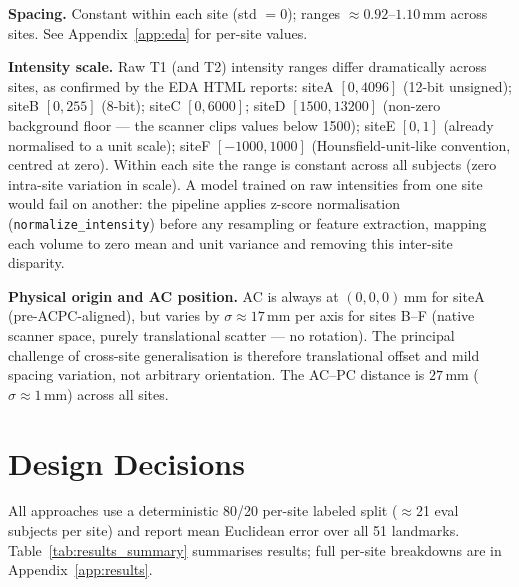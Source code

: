 \documentclass[11pt,letterpaper]{article}
\begin{document}
\textbf{Spacing.}
Constant within each site (std $= 0$); ranges $\approx 0.92$--$1.10$\,mm across sites.
See Appendix~\ref{app:eda} for per-site values.

\textbf{Intensity scale.}
Raw T1 (and T2) intensity ranges differ dramatically across sites, as confirmed by the EDA
HTML reports:
siteA $[0, 4096]$ (12-bit unsigned);
siteB $[0, 255]$ (8-bit);
siteC $[0, 6000]$;
siteD $[1500, 13200]$ (non-zero background floor — the scanner clips values below 1500);
siteE $[0, 1]$ (already normalised to a unit scale);
siteF $[-1000, 1000]$ (Hounsfield-unit-like convention, centred at zero).
Within each site the range is constant across all subjects (zero intra-site variation in
scale).
A model trained on raw intensities from one site would fail on another: the pipeline applies
z-score normalisation (\texttt{normalize\_intensity}) before any resampling or feature
extraction, mapping each volume to zero mean and unit variance and removing this
inter-site disparity.

\textbf{Physical origin and AC position.}
AC is always at $(0,0,0)$\,mm for siteA (pre-ACPC-aligned), but varies by
$\sigma\approx17$\,mm per axis for sites B--F (native scanner space, purely translational
scatter — no rotation).
The principal challenge of cross-site generalisation is therefore translational offset and
mild spacing variation, not arbitrary orientation.
The AC--PC distance is $27\,\text{mm}$ ($\sigma \approx 1\,\text{mm}$) across all sites.

\section{Design Decisions}
\label{sec:design}

All approaches use a deterministic 80/20 per-site labeled split ($\approx$21 eval subjects
per site) and report mean Euclidean error over all 51 landmarks.
Table~\ref{tab:results_summary} summarises results; full per-site breakdowns are in
Appendix~\ref{app:results}.
\end{document}
